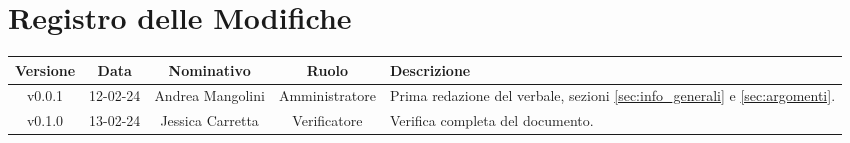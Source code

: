 \section*{\Large Registro delle Modifiche}
    \begin{table}[h]
        \centering
        \renewcommand\tabularxcolumn[1]{m{#1}} %
        \renewcommand{\arraystretch}{1.5}
        \begin{tabularx}{0.98\textwidth}
            {c|c|c|c|>{\centering\arraybackslash}X}
            \rowcolor{black}
            \textbf{\color{white} Versione} & \textbf{\color{white} Data} & \textbf{\color{white} Nominativo} & \textbf{\color{white} Ruolo} & \textbf{\color{white} Descrizione} \\ 
            \hline

            v0.0.1 & 12-02-24 & Andrea Mangolini & Amministratore & Prima redazione del verbale, sezioni \ref{sec:info_generali} e \ref{sec:argomenti}. \\
            v0.1.0 & 13-02-24 & Jessica Carretta & Verificatore & Verifica completa del documento. \\
            \hline
        \end{tabularx}
    \end{table}